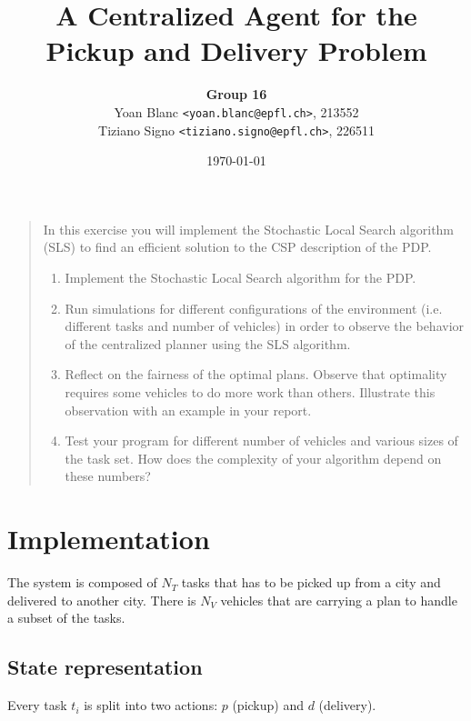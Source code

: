\documentclass[11pt,a4paper]{article}
\title{\phantomsection%
    A Centralized Agent for the Pickup and Delivery Problem
}
\author{
    \textbf{Group 16}\\
    Yoan Blanc \texttt{<yoan.blanc@epfl.ch>}, 213552\\
    Tiziano Signo \texttt{<tiziano.signo@epfl.ch>}, 226511
}
\date{\today}
\begin{document}
\maketitle

\noindent
\begin{quote}{\it

    In this exercise you will implement the Stochastic Local Search algorithm
    (SLS) to find an efficient solution to the CSP description of the PDP.

    \begin{enumerate}
        \item Implement the Stochastic Local Search algorithm for the PDP.

        \item Run simulations for different configurations of the environment
        (i.e. different tasks and number of vehicles) in order to observe the
        behavior of the centralized planner using the SLS algorithm.

        \item Reflect on the fairness of the optimal plans. Observe that
        optimality requires some vehicles to do more work than others.
        Illustrate this observation with an example in your report.

        \item Test your program for different number of vehicles and various
        sizes of the task set. How does the complexity of your algorithm depend
        on these numbers?

    \end{enumerate}

}\end{quote}

\newpage
\section*{Implementation}

The system is composed of $N_T$ tasks that has to be picked up from a city
and delivered to another city. There is $N_V$ vehicles that are carrying a
plan to handle a subset of the tasks.

\subsection*{State representation}

Every task $t_i$ is split into two actions: $p$ (pickup) and $d$ (delivery).
\end{document}

